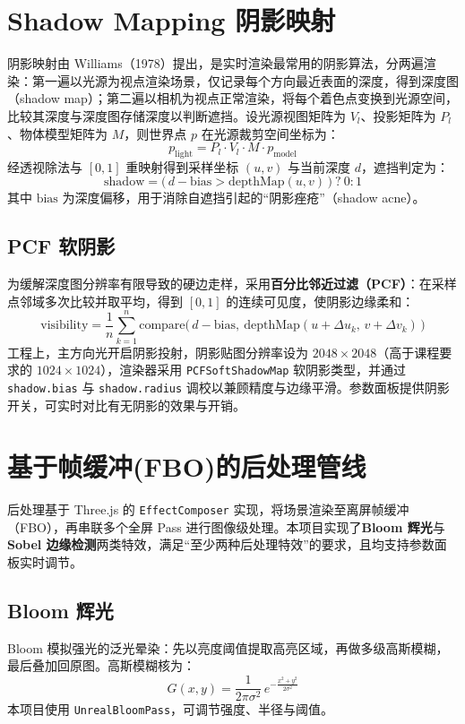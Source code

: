 \documentclass[11pt, a4paper, oneside]{report}
\newcommand{\keyword}[1]{\textbf{#1}}
\newcommand{\code}[1]{\texttt{#1}}
\begin{document}
\section{Shadow Mapping 阴影映射}
阴影映射由 Williams（1978）提出，是实时渲染最常用的阴影算法，分两遍渲染：第一遍以光源为视点渲染场景，仅记录每个方向最近表面的深度，得到深度图（shadow map）；第二遍以相机为视点正常渲染，将每个着色点变换到光源空间，比较其深度与深度图存储深度以判断遮挡。设光源视图矩阵为 $V_l$、投影矩阵为 $P_l$、物体模型矩阵为 $M$，则世界点 $p$ 在光源裁剪空间坐标为：
\begin{equation}
p_{\text{light}} = P_l \cdot V_l \cdot M \cdot p_{\text{model}}
\end{equation}
经透视除法与 $[0,1]$ 重映射得到采样坐标 $(u,v)$ 与当前深度 $d$，遮挡判定为：
\begin{equation}
\text{shadow} = \big(\, d - \text{bias} > \text{depthMap}(u,v) \,\big)\ ?\ 0 : 1
\end{equation}
其中 $\text{bias}$ 为深度偏移，用于消除自遮挡引起的“阴影痤疮”（shadow acne）。

\subsection{PCF 软阴影}
为缓解深度图分辨率有限导致的硬边走样，采用\keyword{百分比邻近过滤（PCF）}：在采样点邻域多次比较并取平均，得到 $[0,1]$ 的连续可见度，使阴影边缘柔和：
\begin{equation}
\text{visibility} = \frac{1}{n}\sum_{k=1}^{n} \text{compare}\big(\, d-\text{bias},\ \text{depthMap}(u+\Delta u_k,\, v+\Delta v_k)\,\big)
\end{equation}
工程上，主方向光开启阴影投射，阴影贴图分辨率设为 $2048\times2048$（高于课程要求的 $1024\times1024$），渲染器采用 \code{PCFSoftShadowMap} 软阴影类型，并通过 \code{shadow.bias} 与 \code{shadow.radius} 调校以兼顾精度与边缘平滑。参数面板提供阴影开关，可实时对比有无阴影的效果与开销。

\section{基于帧缓冲(FBO)的后处理管线}
后处理基于 Three.js 的 \code{EffectComposer} 实现，将场景渲染至离屏帧缓冲（FBO），再串联多个全屏 Pass 进行图像级处理。本项目实现了\keyword{Bloom 辉光}与\keyword{Sobel 边缘检测}两类特效，满足“至少两种后处理特效”的要求，且均支持参数面板实时调节。

\subsection{Bloom 辉光}
Bloom 模拟强光的泛光晕染：先以亮度阈值提取高亮区域，再做多级高斯模糊，最后叠加回原图。高斯模糊核为：
\begin{equation}
G(x,y) = \frac{1}{2\pi\sigma^2}\, e^{-\frac{x^2+y^2}{2\sigma^2}}
\end{equation}
本项目使用 \code{UnrealBloomPass}，可调节强度、半径与阈值。
\end{document}
